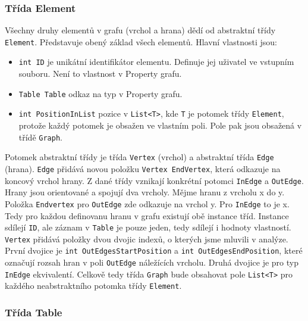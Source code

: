 \subsubsection{Třída Element}

Všechny druhy elementů v grafu (vrchol a hrana) dědí od abstraktní třídy \texttt{Element}.
Představuje obený základ všech elementů.
Hlavní vlastnosti jsou:
\begin{itemize}
\item \texttt{int ID} je unikátní identifikátor elementu. Definuje jej uživatel ve vstupním souboru. Není to vlastnost v Property grafu.
\item \texttt{Table Table} odkaz na typ v Property grafu.
\item \texttt{int PositionInList} pozice v \texttt{List<T>}, kde \texttt{T} je potomek třídy \texttt{Element}, protože každý potomek je obsažen ve vlastním poli.
Pole pak jsou obsažená v třídě \texttt{Graph}.
\end{itemize}

Potomek abstraktní třídy je třída \texttt{Vertex} (vrchol) a abstraktní třída \texttt{Edge} (hrana).
\texttt{Edge} přidává novou položku \texttt{Vertex EndVertex}, která odkazuje na koncový vrchol hrany.
Z dané třídy vznikají konkrétní potomci \texttt{InEdge} a \texttt{OutEdge}.
Hrany jsou orientované a spojují dva vrcholy.
Mějme hranu z vrcholu x do y.
Položka \texttt{Endvertex} pro \texttt{OutEdge} zde odkazuje na vrchol y.
Pro \texttt{InEdge} to je x.
Tedy pro každou definovanu hranu v grafu existují obě instance tříd. 
Instance sdílejí \texttt{ID}, ale záznam v \texttt{Table} je pouze jeden, tedy sdílejí i hodnoty vlastností. 
\texttt{Vertex} přidává položky dvou dvojic indexů, o kterých jsme mluvili v analýze.
První dvojice je \texttt{int OutEdgesStartPosition} a \texttt{int OutEdgesEndPosition}, které označují rozsah hran v poli \texttt{OutEdge} náležících vrcholu.
Druhá dvojice je pro typ \texttt{InEdge} ekvivalentí.
Celkově tedy třída \texttt{Graph} bude obsahovat pole \texttt{List<T>} pro každého neabstraktního potomka třídy \texttt{Element}.

\subsubsection{Třída Table}

